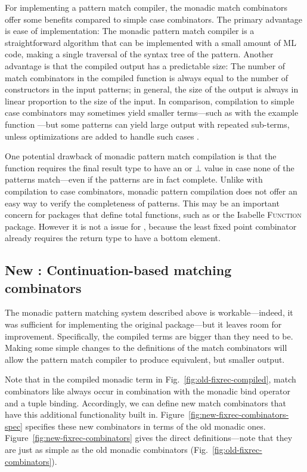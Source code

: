 For implementing a pattern match compiler, the monadic match combinators offer some benefits compared to simple case combinators. The primary advantage is ease of implementation: The monadic pattern match compiler is a straightforward algorithm that can be implemented with a small amount of ML code, making a single traversal of the syntax tree of the pattern. Another advantage is that the compiled output has a predictable size: The number of match combinators in the compiled function is always equal to the number of constructors in the input patterns; in general, the size of the output is always in linear proportion to the size of the input. In comparison, compilation to simple case combinators may sometimes yield smaller terms---such as with the example function ---but some patterns can yield large output with repeated sub-terms, unless optimizations are added to handle such cases \cite[\S 5.4.1]{Wadler87efficient}.

One potential drawback of monadic pattern match compilation is that the  function requires the final result type to have an  or $\bot$ value in case none of the patterns match---even if the patterns are in fact complete. Unlike with compilation to case combinators, monadic pattern compilation does not offer an easy way to verify the completeness of patterns. This may be an important concern for packages that define total functions, such as {\recdef} or the Isabelle \textsc{Function} package. However it is not a issue for {\fixrec}, because the least fixed point combinator  already requires the return type to have a bottom element.

\subsection{New {\fixrec}: Continuation-based matching combinators}

The monadic pattern matching system described above is workable---indeed, it was sufficient for implementing the original {\fixrec} package---but it leaves room for improvement. Specifically, the compiled terms are bigger than they need to be. Making some simple changes to the definitions of the match combinators will allow the pattern match compiler to produce equivalent, but smaller output.

Note that in the compiled monadic term in Fig.~\ref{fig:old-fixrec-compiled}, match combinators like  always occur in combination with the monadic bind operator \hs{({>}>=)} and a tuple binding. Accordingly, we can define new match combinators that have this additional functionality built in. Figure~\ref{fig:new-fixrec-combinators-spec} specifies these new combinators in terms of the old monadic ones. Figure~\ref{fig:new-fixrec-combinators} gives the direct definitions---note that they are just as simple as the old monadic combinators (Fig.~\ref{fig:old-fixrec-combinators}).


